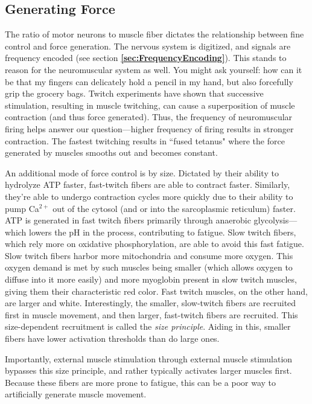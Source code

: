 \subsection{Generating Force}

The ratio of motor neurons to muscle fiber dictates the relationship between fine control and force generation. The nervous system is digitized, and signals are frequency encoded (see section \textbf{\ref{sec:FrequencyEncoding}}). This stands to reason for the neuromuscular system as well. You might ask yourself: how can it be that my fingers can delicately hold a pencil in my hand, but also forcefully grip the grocery bags. Twitch experiments have shown that successive stimulation, resulting in muscle twitching, can cause a superposition of muscle contraction (and thus force generated). Thus, the frequency of neuromuscular firing helps answer our question---higher frequency of firing results in stronger contraction. The fastest twitching results in ``fused tetanus" where the force generated by muscles smooths out and becomes constant.\newline

An additional mode of force control is by size. Dictated by their ability to hydrolyze ATP faster, fast-twitch fibers are able to contract faster. Similarly, they're able to undergo contraction cycles more quickly due to their ability to pump Ca$^{2+}$ out of the cytosol (and or into the sarcoplasmic reticulum) faster. ATP is generated in fast twitch fibers primarily through anaerobic glycolysis---which lowers the pH in the process, contributing to fatigue. Slow twitch fibers, which rely more on oxidative phosphorylation, are able to avoid this fast fatigue. Slow twitch fibers harbor more mitochondria and consume more oxygen. This oxygen demand is met by such muscles being smaller (which allows oxygen to diffuse into it more easily) and more myoglobin present in slow twitch muscles, giving them their characteristic red color. Fast twitch muscles, on the other hand, are larger and white. Interestingly, the smaller, slow-twitch fibers are recruited first in muscle movement, and then larger, fast-twitch fibers are recruited. This size-dependent recruitment is called the \textit{size principle}. Aiding in this, smaller fibers have lower activation thresholds than do large ones. \newline

Importantly, external muscle stimulation through external muscle stimulation bypasses this size principle, and rather typically activates larger muscles first. Because these fibers are more prone to fatigue, this can be a poor way to artificially generate muscle movement.\newline

